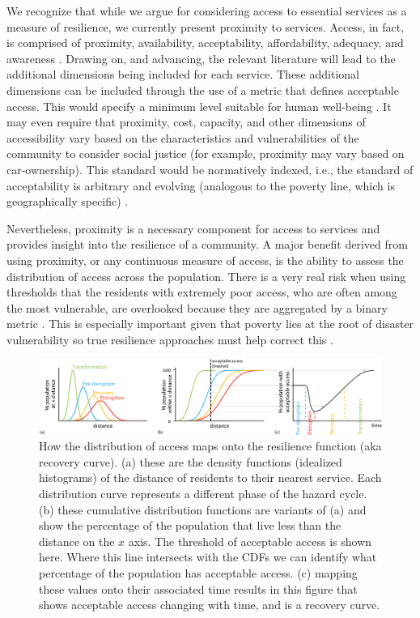 \documentclass[onecolumn,doublespacing]{risa}
\let \cite \parencite
\begin{document}
We recognize that while we argue for considering access to essential services as a measure of resilience, we  currently present proximity to services. 
Access, in fact, is comprised of proximity, availability, acceptability, affordability, adequacy, and awareness \cite{Saurman2016-gj, Penchansky1981-qh}. 
Drawing on, and advancing, the relevant literature will lead to the additional dimensions being included for each service. 
These additional dimensions can be included through the use of a metric that defines acceptable access. 
This would specify a minimum level suitable for human well-being \cite{Doorn2018-fx}.
It may even require that proximity, cost, capacity, and other dimensions of accessibility vary based on the characteristics and vulnerabilities of the community to consider social justice (for example, proximity may vary based on car-ownership).
This standard would be normatively indexed, i.e., the standard of acceptability is arbitrary and evolving (analogous to the poverty line, which is geographically specific) \cite{Constas2014-ui}.

Nevertheless, proximity is a necessary component for access to services and provides insight into the resilience of a community. 
A major benefit derived from using proximity, or any continuous measure of access, is the ability to assess the distribution of access across the population. 
There is a very real risk when using thresholds that the residents with extremely poor access, who are often among the most vulnerable, are overlooked because they are aggregated by a binary metric \cite{Logan2017-fr}. 
This is especially important given that poverty lies at the root of disaster vulnerability so true resilience approaches must help correct this \cite{Pantelic1991-qu}.

\begin{figure}
    \centering
    \includegraphics[width=\linewidth]{report/fig/dist_to_resil.png}
    \caption{
    How the distribution of access maps onto the resilience function (aka recovery curve). (a) these are the density functions (idealized histograms) of the distance of residents to their nearest service.
    Each distribution curve represents a different phase of the hazard cycle. 
    (b) these cumulative distribution functions are variants of (a) and show the percentage of the population that live less than the distance on the $x$ axis.
    The threshold of acceptable access is shown here. Where this line intersects with the CDFs we can identify what percentage of the population has acceptable access.
    (c) mapping these values onto their associated time results in this figure that shows acceptable access changing with time, and is a recovery curve.
    }
    \label{figS:cdf_to_res}
\end{figure}
\end{document}
